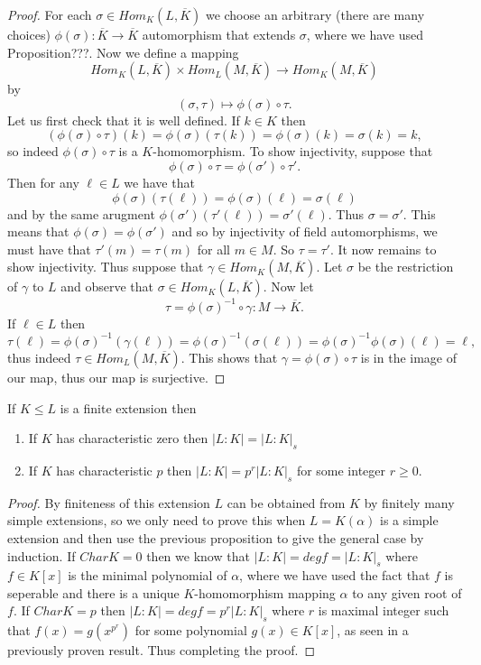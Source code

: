 \documentclass[twoside, a4paper, 10pt]{amsart}
\begin{document}
\begin{proof} For each $\sigma \in Hom_K(L, \overline{K})$ we choose an arbitrary (there are many choices) $\phi(\sigma):\overline{K} \to \overline{K}$ automorphism that extends $\sigma$, where we have used Proposition???. Now we define a mapping $$Hom_K(L, \overline{K}) \times Hom_L(M, \overline{K}) \to Hom_K(M, \overline{K})$$ by $$(\sigma, \tau) \mapsto \phi(\sigma) \circ \tau.$$ Let us first check that it is well defined. If $k \in K$ then $$(\phi(\sigma) \circ \tau) (k) = \phi(\sigma) (\tau(k)) = \phi(\sigma) (k) = \sigma(k) = k,$$ so indeed $\phi(\sigma) \circ \tau$ is a $K$-homomorphism. To show injectivity, suppose that $$\phi(\sigma) \circ \tau = \phi(\sigma') \circ \tau'.$$ Then for any $\ell \in L$ we have that $$\phi(\sigma)(\tau(\ell)) = \phi(\sigma)(\ell) = \sigma(\ell)$$ and by the same arugment $\phi(\sigma')(\tau'(\ell)) = \sigma'(\ell)$. Thus $\sigma = \sigma'$. This means that $\phi(\sigma) = \phi(\sigma')$ and so by injectivity of field automorphisms, we must have that $\tau'(m) = \tau(m)$ for all $m \in M$. So $\tau = \tau'$. It now remains to show injectivity. Thus suppose that $\gamma \in Hom_K(M, \overline{K})$. Let $\sigma$ be the restriction of $\gamma$ to $L$ and observe that $\sigma \in Hom_K(L, \overline{K})$. Now let $$\tau = \phi(\sigma)^{-1} \circ \gamma:M \to \overline{K}.$$ If $\ell \in L$ then $$\tau(\ell) = \phi(\sigma)^{-1}(\gamma(\ell)) = \phi(\sigma)^{-1}(\sigma(\ell)) = \phi(\sigma)^{-1} \phi(\sigma)(\ell) = \ell,$$ thus indeed $\tau \in Hom_L(M, \overline{K})$. This shows that $\gamma = \phi(\sigma) \circ \tau$ is in the image of our map, thus our map is surjective. \end{proof}

\begin{prop} If $K \leq L$ is a finite extension then 
\begin{enumerate}
	\item If $K$ has characteristic zero then $|L:K| = |L:K|_s$
	\item If $K$ has characteristic $p$ then $|L:K| = p^r|L:K|_s$ for some integer $r \geq 0$.
\end{enumerate}
\end{prop}

\begin{proof} By finiteness of this extension $L$ can be obtained from $K$ by finitely many simple extensions, so we only need to prove this when $L = K(\alpha)$ is a simple extension and then use the previous proposition to give the general case by induction. If $Char K = 0$ then we know that $|L:K| = deg f = |L:K|_s$ where $f \in K[x]$ is the minimal polynomial of $\alpha$, where we have used the fact that $f$ is seperable and there is a unique $K$-homomorphism mapping $\alpha$ to any given root of $f$. If $Char K = p$ then $|L:K| = deg f = p^r |L:K|_s$ where $r$ is maximal integer such that $f(x) = g(x^{p^r})$ for some polynomial $g(x) \in K[x]$, as seen in a previously proven result. Thus completing the proof. \end{proof}
\end{document}
